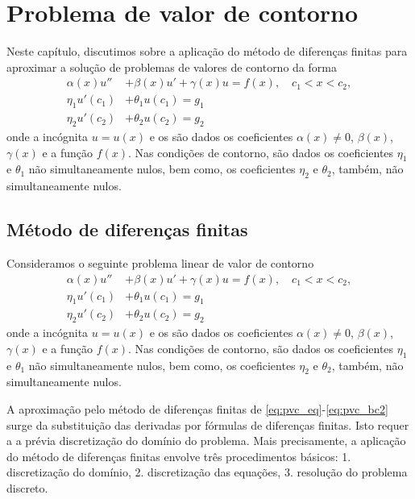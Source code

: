 

\chapter{Problema de valor de contorno}\label{cap_pvc}
\thispagestyle{fancy}

Neste capítulo, discutimos sobre a aplicação do método de diferenças finitas para aproximar a solução de problemas de valores de contorno da forma
\begin{align}
  \alpha(x) u'' &+ \beta(x) u' + \gamma(x) u = f(x),\quad c_1 < x < c_2,\\
  \eta_1 u'(c_1) &+ \theta_1 u(c_1) = g_1\\
  \eta_2 u'(c_2) &+ \theta_2 u(c_2) = g_2
\end{align}
onde a incógnita $u = u(x)$ e os são dados os coeficientes $\alpha(x)\neq 0$, $\beta(x)$, $\gamma(x)$ e a função $f(x)$. Nas condições de contorno, são dados os coeficientes $\eta_1$ e $\theta_1$ não simultaneamente nulos, bem como, os coeficientes $\eta_2$ e $\theta_2$, também, não simultaneamente nulos.

\section{Método de diferenças finitas}\label{cap_pvc_sec_mdf}

Consideramos o seguinte problema linear de valor de contorno
\begin{align}
  \alpha(x) u'' &+ \beta(x) u' + \gamma(x) u = f(x),\quad c_1 < x < c_2, \label{eq:pvc_eq}\\
  \eta_1 u'(c_1) &+ \theta_1 u(c_1) = g_1 \label{eq:pvc_bc1}\\
  \eta_2 u'(c_2) &+ \theta_2 u(c_2) = g_2 \label{eq:pvc_bc2}
\end{align}
onde a incógnita $u = u(x)$ e os são dados os coeficientes $\alpha(x)\neq 0$, $\beta(x)$, $\gamma(x)$ e a função $f(x)$. Nas condições de contorno, são dados os coeficientes $\eta_1$ e $\theta_1$ não simultaneamente nulos, bem como, os coeficientes $\eta_2$ e $\theta_2$, também, não simultaneamente nulos.

A aproximação pelo método de diferenças finitas de \eqref{eq:pvc_eq}-\eqref{eq:pvc_bc2} surge da substituição das derivadas por fórmulas de diferenças finitas. Isto requer a a prévia discretização do domínio do problema. Mais precisamente, a aplicação do método de diferenças finitas envolve três procedimentos básicos: 1. discretização do domínio, 2. discretização das equações, 3. resolução do problema discreto.

